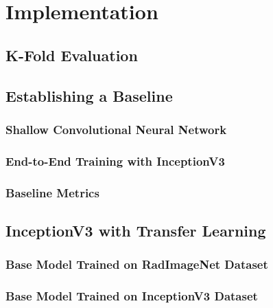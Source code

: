 \chapter{Implementation}\label{implementation}

\section{K-Fold Evaluation}







\section{Establishing a Baseline}

\subsection{Shallow Convolutional Neural Network}





\subsection{End-to-End Training with InceptionV3}





\subsection{Baseline Metrics}

\section{InceptionV3 with Transfer Learning}

\subsection{Base Model Trained on RadImageNet Dataset}



\subsection{Base Model Trained on InceptionV3 Dataset}

